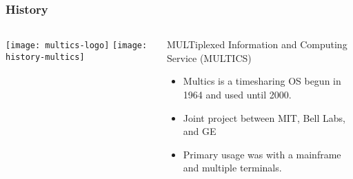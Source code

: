 


\begin{frame}[plain]
	\frametitle{History}
	
	
	
	\begin{columns}
		
		\begin{column}{.5\textwidth}
			\texttt{[image: multics-logo]}
			\texttt{[image: history-multics]}


			
		\end{column}
		
		\begin{column}{.5\textwidth}
			
			\large
			MULTiplexed Information and Computing Service (MULTICS)
			\begin{itemize}
				\item Multics is a timesharing OS begun in 1964
				and used until 2000.
				
				\item  Joint project between MIT, Bell Labs, and GE
				
				\item  Primary usage was with a mainframe and
				multiple terminals.
				

			\end{itemize}	
			
		\end{column}
		
		
	\end{columns}
	
	
\end{frame}

